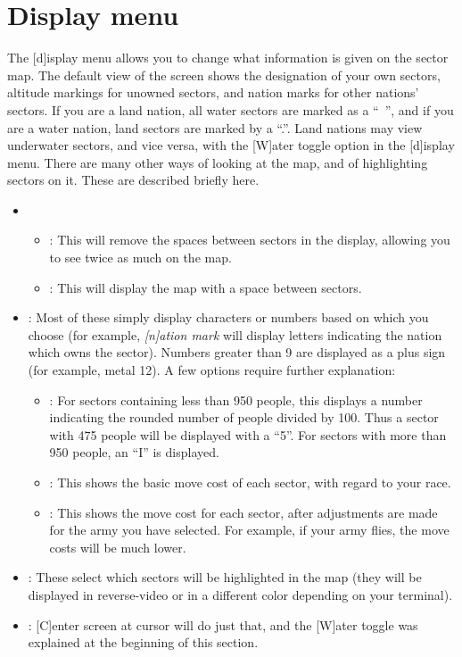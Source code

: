 \section{Display menu}
The [d]isplay menu allows you to change what information is given on
the sector map.  The default view of the screen shows the designation
of your own sectors, altitude markings for unowned sectors, and nation
marks for other nations' sectors.  If you are a land nation, all water
sectors are marked as a ``~'', and if you are a water nation, land
sectors are marked by a ``.''.  Land nations may view underwater
sectors, and vice versa, with the [W]ater toggle option in the
[d]isplay menu.  There are many other ways of looking at the map, and
of highlighting sectors on it.  These are described briefly here.
\begin{itemize}
\item
{}
\begin{itemize}
\item
{}: This will remove the spaces between sectors in the
display, allowing you to see twice as much on the map.
\item
{}: This will display the map with a space between sectors.
\end{itemize}
\item
{}: Most of these simply display characters or numbers
based on which you choose (for example, {\em [n]ation mark} will
display letters indicating the nation which owns the sector).  Numbers
greater than 9 are displayed as a plus sign (for example, metal 12). A
few options require further explanation:
\begin{itemize}
\item
{}: For sectors containing less than 950 people, this
displays a number indicating the rounded number of people divided by 100.
Thus a sector with 475 people will be displayed with a ``5''.  For sectors
with more than 950 people, an ``I'' is displayed.
\item
{}: This shows the basic move cost of each sector,
with regard to your race.
\item
{}: This shows the move cost for each sector, after
adjustments are made for the army you have selected.  For example, if your
army flies, the move costs will be much lower.
\end{itemize}
\item
{}: These select which sectors will be highlighted
in the map (they will be displayed in reverse-video or in a different
color depending on your terminal).
\item
{}: [C]enter screen at cursor will do just that, and
the [W]ater toggle was explained at the beginning of this section.
\end{itemize}


